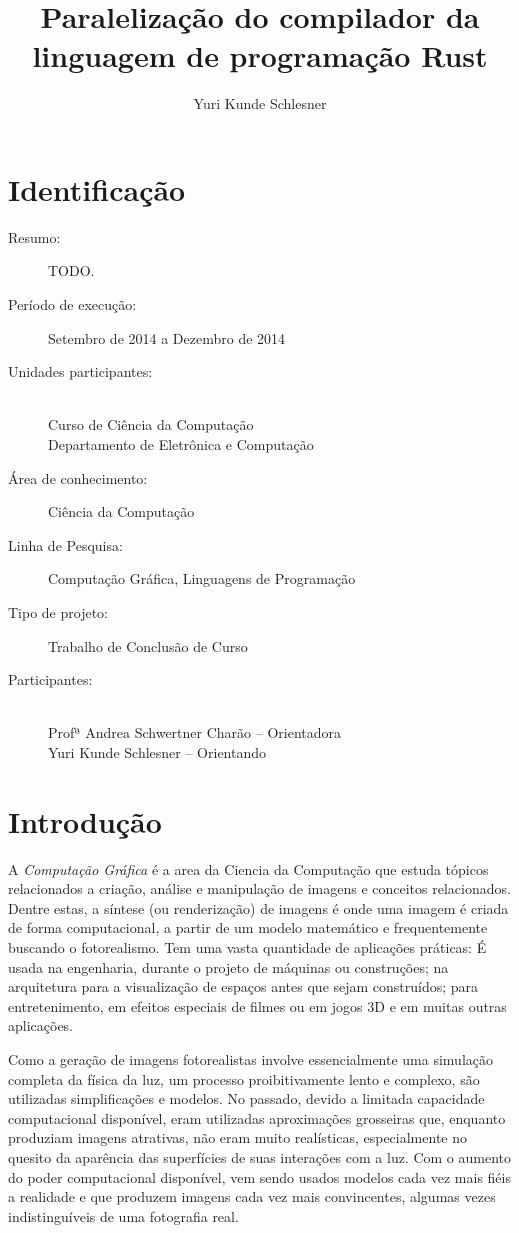 \documentclass[12pt]{article}
\title{Paralelização do compilador da linguagem de programação Rust}
\author{Yuri Kunde Schlesner}
\newcommand{\todo}[1]{\textsf{\color{red}#1}}
\begin{document}
\maketitle

\section{Identificação}

\begin{description}
	\item[Resumo:] \todo{TODO.}
	\item[Período de execução:] Setembro de 2014 a Dezembro de 2014
	\item[Unidades participantes:] ~\\ Curso de Ciência da Computação \\ Departamento de Eletrônica e Computação
	\item[Área de conhecimento:] Ciência da Computação
	\item[Linha de Pesquisa:] Computação Gráfica, Linguagens de Programação
	\item[Tipo de projeto:] Trabalho de Conclusão de Curso
	\item[Participantes:] ~\\ Profª Andrea Schwertner Charão -- Orientadora \\ Yuri Kunde Schlesner -- Orientando
\end{description}

\section{Introdução}

A \emph{Computação Gráfica} é a area da Ciencia da Computação que estuda tópicos relacionados a criação, análise e manipulação de imagens e conceitos relacionados. Dentre estas, a síntese (ou renderização) de imagens é onde uma imagem é criada de forma computacional, a partir de um modelo matemático e frequentemente buscando o fotorealismo. Tem uma vasta quantidade de aplicações práticas: É usada na engenharia, durante o projeto de máquinas ou construções; na arquitetura para a visualização de espaços antes que sejam construídos; para entretenimento, em efeitos especiais de filmes ou em jogos 3D e em muitas outras aplicações.

Como a geração de imagens fotorealistas involve essencialmente uma simulação completa da física da luz, um processo proibitivamente lento e complexo, são utilizadas simplificações e modelos. No passado, devido a limitada capacidade computacional disponível, eram utilizadas aproximações grosseiras que, enquanto produziam imagens atrativas, não eram muito realísticas, especialmente no quesito da aparência das superfícies de suas interações com a luz. Com o aumento do poder computacional disponível, vem sendo usados modelos cada vez mais fiéis a realidade e que produzem imagens cada vez mais convincentes, algumas vezes indistinguíveis de uma fotografia real.
\end{document}
